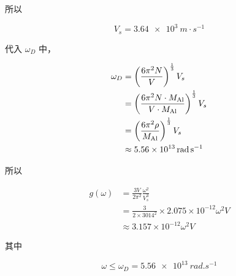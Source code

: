 所以

\begin{equation*}
    V_s = \qty{3.64e3}{m·s^{-1}}
\end{equation*}

代入 $\omega_D$ 中，

\begin{align*}
    \omega_D &= \left(\frac{6\pi^2 N}{V}\right)^{\frac{1}{3}} V_s \\
    &= \left(\frac{6\pi^2 N \cdot M_{\ce{Al}}}{V \cdot M_{\ce{Al}}}\right)^{\frac{1}{3}} V_s \\
    &= \left(\frac{6\pi^2 \rho}{M_{\ce{Al}}}\right)^{\frac{1}{3}} V_s \\
    &\approx \qty{5.56e13}{rad.s^{-1}}
\end{align*}

所以

\begin{align*}
    g(\omega) &= \frac{3V}{2\pi^2} \frac{\omega^2}{V_s^3} \\
    &= \frac{3}{2 \times 3014^2} \times 2.075 \times 10^{-12} \omega^2 V \\
    &\approx 3.157 \times 10^{-12} \omega^2 V
\end{align*}

其中

\begin{equation*}
    \omega \le \omega_D = \qty{5.56e13}{rad.s^{-1}}
\end{equation*}
